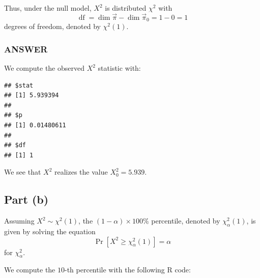 \documentclass[
]{article}
\newenvironment{Shaded}{\begin{snugshade}}{\end{snugshade}}
\newcommand{\AttributeTok}[1]{\textcolor[rgb]{0.13,0.29,0.53}{#1}}
\newcommand{\ConstantTok}[1]{\textcolor[rgb]{0.56,0.35,0.01}{#1}}
\newcommand{\DecValTok}[1]{\textcolor[rgb]{0.00,0.00,0.81}{#1}}
\newcommand{\FloatTok}[1]{\textcolor[rgb]{0.00,0.00,0.81}{#1}}
\newcommand{\FunctionTok}[1]{\textcolor[rgb]{0.13,0.29,0.53}{\textbf{#1}}}
\newcommand{\NormalTok}[1]{#1}
\newcommand{\OtherTok}[1]{\textcolor[rgb]{0.56,0.35,0.01}{#1}}
\newcommand{\SpecialCharTok}[1]{\textcolor[rgb]{0.81,0.36,0.00}{\textbf{#1}}}
\begin{document}
Thus, under the null model, \(X^2\) is distributed \(\chi^2\) with \[
  \operatorname{df} = \dim \vec{\pi} - \dim \vec{\pi}_0 = 1 - 0 = 1
\] degrees of freedom, denoted by \(\chi^2(1)\).

\hypertarget{answer}{%
\subsubsection{ANSWER}\label{answer}}

We compute the observed \(X^2\) statistic with:

\begin{Shaded}
\end{Shaded}

\begin{verbatim}
## $stat
## [1] 5.939394
## 
## $p
## [1] 0.01480611
## 
## $df
## [1] 1
\end{verbatim}

We see that \(X^2\) realizes the value \(X_0^2 = 5.939\).

\hypertarget{part-b}{%
\subsection{Part (b)}\label{part-b}}


Assuming \(X^2 \sim \chi^2(1)\), the \((1-\alpha) \times 100 \%\)
percentile, denoted by \(\chi_{\alpha}^2(1)\), is given by solving the
equation \[
  \Pr[X^2 \geq \chi_{\alpha}^2(1)] = \alpha
\] for \(\chi_{\alpha}^2\).

We compute the \(10\)-th percentile with the following R code:

\begin{Shaded}
\end{Shaded}
\end{document}
